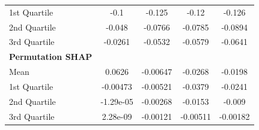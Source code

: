{\begin{tabular} {lcccc}
\hspace{7pt}1st Quartile & \cellcolor{silver!60}-0.1 & \cellcolor{bronze!60}-0.125 & \cellcolor{bronze!60}-0.12 & \cellcolor{bronze!60}-0.126 \\ 
\hspace{7pt}2nd Quartile & \cellcolor{silver!60}-0.048 & \cellcolor{bronze!60}-0.0766 & \cellcolor{bronze!60}-0.0785 & \cellcolor{bronze!60}-0.0894 \\ 
\hspace{7pt}3rd Quartile & \cellcolor{silver!60}-0.0261 & \cellcolor{bronze!60}-0.0532 & \cellcolor{bronze!60}-0.0579 & \cellcolor{bronze!60}-0.0641 \\ 
\addlinespace[1ex] 
\textbf{Permutation SHAP} &  &  &  &  \\ 
\hspace{7pt}Mean & 0.0626 & -0.00647 & -0.0268 & -0.0198 \\ 
\hspace{7pt}1st Quartile & \cellcolor{bronze!60}-0.00473 & -0.00521 & -0.0379 & -0.0241 \\ 
\hspace{7pt}2nd Quartile & \cellcolor{bronze!60}-1.29e-05 & -0.00268 & -0.0153 & -0.009 \\ 
\hspace{7pt}3rd Quartile & 2.28e-09 & -0.00121 & -0.00511 & -0.00182 \\ 
\bottomrule
\end{tabular}}